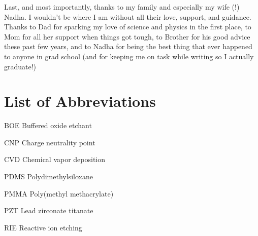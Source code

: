 \documentclass[edeposit,fullpage,draftthesis]{uiucthesis2009}
\begin{document}
Last, and most importantly, thanks to my family and especially my wife (!) Nadha.
I wouldn't be where I am without all their love, support, and guidance. Thanks to Dad
for sparking my love of science and physics in the first place, to Mom for all her support
when things got tough, to Brother for his good advice these past few years, and 
to Nadha for being the best thing that ever happened to anyone in grad school 
(and for keeping me on task while writing so I actually graduate!)





\setcounter{tocdepth}{2}

\tableofcontents
\listoffigures

\chapter{List of Abbreviations}

\begin{symbollist*}
\item[BOE] Buffered oxide etchant
\item[CNP] Charge neutrality point
\item[CVD] Chemical vapor deposition
\item[PDMS] Polydimethylsiloxane
\item[PMMA] Poly(methyl methacrylate)
\item[PZT] Lead zirconate titanate
\item[RIE] Reactive ion etching
\end{symbollist*}

\end{document}
